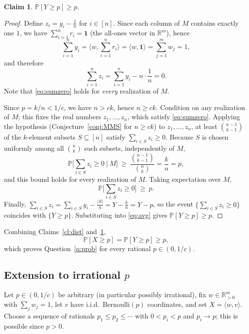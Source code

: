\documentclass[11pt]{amsart}
\theoremstyle{plain}
\newtheorem{claim}[theorem]{Claim}
\def\bR{\mathbb{R}}
\def\Pb{\mathbb{P}}
\begin{document}
\begin{claim}\label{cl:bound}
$\Pb[Y\ge p]\ge p$.
\end{claim}

\begin{proof}
Define $z_i=y_i-\frac1n$ for $i\in[n]$. Since each column of $M$ contains exactly
one $1$, we have $\sum_{i=1}^n r_i=\mathbf 1$ (the all-ones vector in
$\bR^m$), hence
\[
\sum_{i=1}^n y_i=\Big\langle w,\sum_{i=1}^n r_i\Big\rangle
=\langle w,\mathbf 1\rangle=\sum_{j=1}^m w_j=1,
\]
and therefore
\begin{equation}\label{eq:sumzero}
\sum_{i=1}^n z_i=\sum_{i=1}^n y_i-n\cdot\frac1n=0 .
\end{equation}
Note that \eqref{eq:sumzero} holds for \emph{every} realization of $M$.

Since $p=k/n<1/c$, we have $n>ck$, hence $n\ge ck$. Condition on any realization
of $M$; this fixes the real numbers $z_1,\dots,z_n$, which satisfy
\eqref{eq:sumzero}. Applying the hypothesis (Conjecture~\ref{conj:MMS} for
$n\ge ck$) to $z_1,\dots,z_n$, at least $\binom{n-1}{k-1}$ of the $k$-element
subsets $S\subseteq[n]$ satisfy $\sum_{i\in S}z_i\ge0$. Because $S$ is chosen
uniformly among all $\binom{n}{k}$ such subsets, independently of $M$,
\[
\Pb\Big[\textstyle\sum_{i\in S}z_i\ge0 \ \Big|\ M\Big]
\ \ge\ \frac{\binom{n-1}{k-1}}{\binom{n}{k}}
=\frac{k}{n}=p ,
\]
and this bound holds for every realization of $M$. Taking expectation over $M$,
\begin{equation}\label{eq:avg}
\Pb\Big[\textstyle\sum_{i\in S}z_i\ge0\Big]\ \ge\ p .
\end{equation}
Finally, $\sum_{i\in S}z_i=\sum_{i\in S}y_i-\frac{|S|}{n}=Y-\frac{k}{n}=Y-p$, so
the event $\{\sum_{i\in S}z_i\ge0\}$ coincides with $\{Y\ge p\}$. Substituting
into \eqref{eq:avg} gives $\Pb[Y\ge p]\ge p$.
\end{proof}

Combining Claims~\ref{cl:dist} and~\ref{cl:bound},
\[
\Pb[X\ge p]=\Pb[Y\ge p]\ge p ,
\]
which proves Question~\ref{q:prob} for every rational $p\in(0,1/c)$.

\subsection{Extension to irrational $p$}

Let $p\in(0,1/c)$ be arbitrary (in particular possibly irrational), fix
$w\in\bR_{>0}^m$ with $\sum_j w_j=1$, let $v$ have i.i.d.\
$\mathrm{Bernoulli}(p)$ coordinates, and set $X=\langle w,v\rangle$. Choose a
sequence of rationals $p_1\le p_2\le\cdots$ with $0<p_i<p$ and $p_i\to p$; this is
possible since $p>0$.
\end{document}
